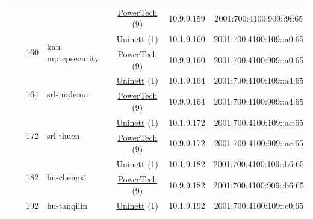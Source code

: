 \begin{small}
\begin{center}
\begin{longtable}{|c|c|c|c|c|c|c|c|}
  &  &  &  & \multicolumn{2}{|c|}{\tiny{\href{http://www.powertech.no}{PowerTech} (9)}} & \tiny{10.9.9.159} & \tiny{2001:700:4100:909::9f:65} \\* \cline{3-3}\cline{4-4}\cline{5-5}\cline{6-6}\cline{7-7}\cline{8-8}
  &  & \multirow{2}{*}{\tiny{160}} & \multicolumn{1}{|l|}{\multirow{2}{*}{\tiny{kau-mptcpsecurity}}} & \multicolumn{2}{|c|}{\tiny{\href{https://www.uninett.no}{Uninett} (1)}} & \tiny{10.1.9.160} & \tiny{2001:700:4100:109::a0:65} \\* \cline{5-5}\cline{6-6}\cline{7-7}\cline{8-8}
  &  &  &  & \multicolumn{2}{|c|}{\tiny{\href{http://www.powertech.no}{PowerTech} (9)}} & \tiny{10.9.9.160} & \tiny{2001:700:4100:909::a0:65} \\* \cline{3-3}\cline{4-4}\cline{5-5}\cline{6-6}\cline{7-7}\cline{8-8}
  &  & \multirow{2}{*}{\tiny{164}} & \multicolumn{1}{|l|}{\multirow{2}{*}{\tiny{srl-nndemo}}} & \multicolumn{2}{|c|}{\tiny{\href{https://www.uninett.no}{Uninett} (1)}} & \tiny{10.1.9.164} & \tiny{2001:700:4100:109::a4:65} \\* \cline{5-5}\cline{6-6}\cline{7-7}\cline{8-8}
  &  &  &  & \multicolumn{2}{|c|}{\tiny{\href{http://www.powertech.no}{PowerTech} (9)}} & \tiny{10.9.9.164} & \tiny{2001:700:4100:909::a4:65} \\* \cline{3-3}\cline{4-4}\cline{5-5}\cline{6-6}\cline{7-7}\cline{8-8}
  &  & \multirow{2}{*}{\tiny{172}} & \multicolumn{1}{|l|}{\multirow{2}{*}{\tiny{srl-thuen}}} & \multicolumn{2}{|c|}{\tiny{\href{https://www.uninett.no}{Uninett} (1)}} & \tiny{10.1.9.172} & \tiny{2001:700:4100:109::ac:65} \\* \cline{5-5}\cline{6-6}\cline{7-7}\cline{8-8}
  &  &  &  & \multicolumn{2}{|c|}{\tiny{\href{http://www.powertech.no}{PowerTech} (9)}} & \tiny{10.9.9.172} & \tiny{2001:700:4100:909::ac:65} \\* \cline{3-3}\cline{4-4}\cline{5-5}\cline{6-6}\cline{7-7}\cline{8-8}
  &  & \multirow{2}{*}{\tiny{182}} & \multicolumn{1}{|l|}{\multirow{2}{*}{\tiny{hu-chengxi}}} & \multicolumn{2}{|c|}{\tiny{\href{https://www.uninett.no}{Uninett} (1)}} & \tiny{10.1.9.182} & \tiny{2001:700:4100:109::b6:65} \\* \cline{5-5}\cline{6-6}\cline{7-7}\cline{8-8}
  &  &  &  & \multicolumn{2}{|c|}{\tiny{\href{http://www.powertech.no}{PowerTech} (9)}} & \tiny{10.9.9.182} & \tiny{2001:700:4100:909::b6:65} \\* \cline{3-3}\cline{4-4}\cline{5-5}\cline{6-6}\cline{7-7}\cline{8-8}
  &  & \multirow{2}{*}{\tiny{192}} & \multicolumn{1}{|l|}{\multirow{2}{*}{\tiny{hu-tanqilin}}} & \multicolumn{2}{|c|}{\tiny{\href{https://www.uninett.no}{Uninett} (1)}} & \tiny{10.1.9.192} & \tiny{2001:700:4100:109::c0:65} \\* \cline{5-5}\cline{6-6}\cline{7-7}\cline{8-8}

\end{longtable}
\end{center}
\end{small}
